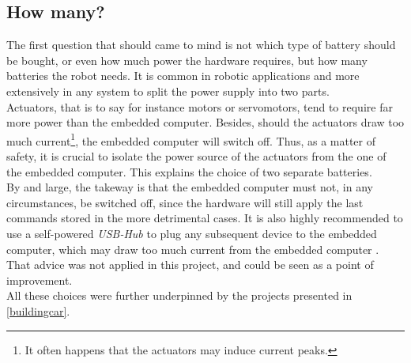 		\subsection{How many?}
		The first question that should came to mind is not which type of battery
		should be bought, or even
		how much power the hardware requires, but how many batteries the robot 
		needs. It is common in robotic applications and more 
		extensively in any system to split the power supply into two parts.\cite{racecarj} 
		\\\indent Actuators, that is to say for instance motors
		or servomotors, tend to require far more power than the embedded computer. Besides, 
		should the actuators draw too much current\footnote{It often happens that the 
		actuators may induce current peaks.}, the embedded computer will switch off. Thus, 
		as a matter of safety, it is crucial to isolate the power source of the actuators
		from the one of the embedded computer. This explains the choice of two separate 
		batteries.
		\\\indent By and large, the takeway is that the embedded computer must not, 
		in any circumstances, be switched off, since the hardware will still 
		apply the last commands stored in the more detrimental cases. It is 
		also highly recommended to use a self-powered \textit{USB-Hub}
		to plug any subsequent device to the embedded computer, which 
		may draw too much current from the embedded computer \cite{racecarj}.
		That advice was not applied in this project, and could be
		seen as a point of improvement.
		\\\indent All these choices were further underpinned by 
		the projects presented in \vref{buildingcar}.
		
